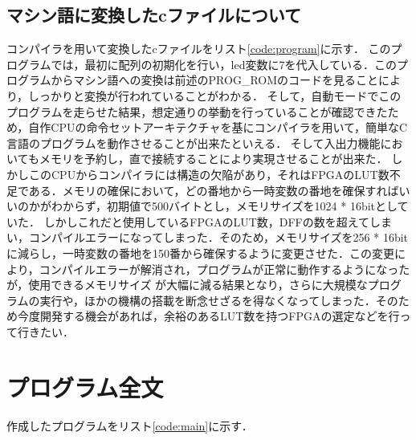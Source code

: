 \documentclass[a4paper,11pt]{ltjsarticle}
\begin{document}
\subsection{マシン語に変換したcファイルについて}
コンパイラを用いて変換したcファイルをリスト\ref{code:program}に示す．
このプログラムでは，最初に配列の初期化を行い，led変数に7を代入している．このプログラムからマシン語への変換は前述のPROG\_ROMのコードを見ることにより，しっかりと変換が行われていることがわかる．
そして，自動モードでこのプログラムを走らせた結果，想定通りの挙動を行っていることが確認できたため，自作CPUの命令セットアーキテクチャを基にコンパイラを用いて，簡単なC言語のプログラムを動作させることが出来たといえる．
そして入出力機能においてもメモリを予約し，直で接続することにより実現させることが出来た．
しかしこのCPUからコンパイラには構造の欠陥があり，それはFPGAのLUT数不足である．メモリの確保において，どの番地から一時変数の番地を確保すればいいのかがわからず，初期値で500バイトとし，メモリサイズを1024 * 16bitとしていた．
しかしこれだと使用しているFPGAのLUT数，D\-FFの数を超えてしまい，コンパイルエラーになってしまった．そのため，メモリサイズを256 * 16bitに減らし，一時変数の番地を150番から確保するように変更させた．この変更により，コンパイルエラーが解消され，プログラムが正常に動作するようになったが，使用できるメモリサイズ
が大幅に減る結果となり，さらに大規模なプログラムの実行や，ほかの機構の搭載を断念せざるを得なくなってしまった．そのため今度開発する機会があれば，余裕のあるLUT数を持つFPGAの選定などを行って行きたい．
\section{プログラム全文}
作成したプログラムをリスト\ref{code:main}に示す．
\end{document}
